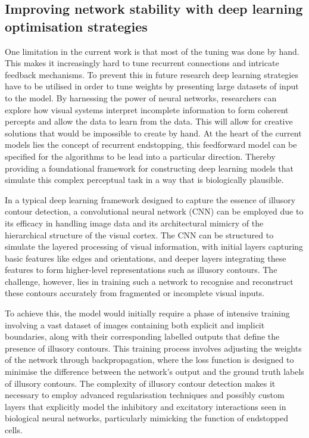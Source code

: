 \documentclass[12pt]{article}
\begin{document}
\subsection{Improving network stability with deep learning optimisation strategies}
One limitation in the current work is that most of the tuning was done by hand. This makes it increasingly hard to tune recurrent connections and intricate feedback mechanisms. To prevent this in future research deep learning strategies have to be utilised in order to tune weights by presenting large datasets of input to the model. By harnessing the power of neural networks, researchers can explore how visual systems interpret incomplete information to form coherent percepts and allow the data to learn from the data. This will allow for creative solutions that would be impossible to create by hand. At the heart of the current models lies the concept of recurrent endstopping, this feedforward model can be specified for the algorithms to be lead into a particular direction. Thereby providing a foundational framework for constructing deep learning models that simulate this complex perceptual task in a way that is biologically plausible.

In a typical deep learning framework designed to capture the essence of illusory contour detection, a convolutional neural network (CNN) can be employed due to its efficacy in handling image data and its architectural mimicry of the hierarchical structure of the visual cortex. The CNN can be structured to simulate the layered processing of visual information, with initial layers capturing basic features like edges and orientations, and deeper layers integrating these features to form higher-level representations such as illusory contours. The challenge, however, lies in training such a network to recognise and reconstruct these contours accurately from fragmented or incomplete visual inputs.

To achieve this, the model would initially require a phase of intensive training involving a vast dataset of images containing both explicit and implicit boundaries, along with their corresponding labelled outputs that define the presence of illusory contours. This training process involves adjusting the weights of the network through backpropagation, where the loss function is designed to minimise the difference between the network's output and the ground truth labels of illusory contours. The complexity of illusory contour detection makes it necessary to employ advanced regularisation techniques and possibly custom layers that explicitly model the inhibitory and excitatory interactions seen in biological neural networks, particularly mimicking the function of endstopped cells.
\end{document}
